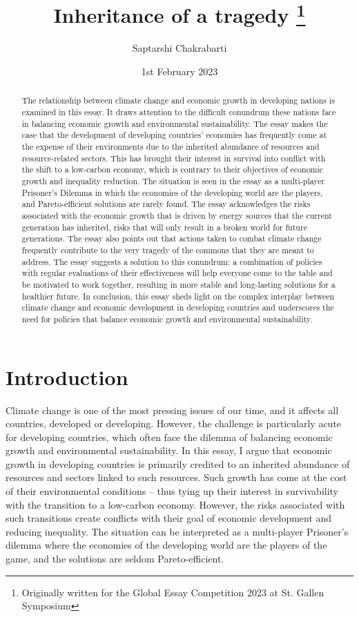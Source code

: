 \documentclass[11pt,a4paper]{article}
\title{Inheritance of a tragedy \footnote{Originally written for the Global Essay Competition 2023 at St. Gallen Symposium}}
\author{Saptarshi Chakrabarti}
\date{1st February 2023}
\begin{document}
\maketitle

\begin{abstract}
The relationship between climate change and economic growth in developing nations is examined in this essay. It draws attention to the difficult conundrum these nations face in balancing economic growth and environmental sustainability. The essay makes the case that the development of developing countries' economies has frequently come at the expense of their environments due to the inherited abundance of resources and resource-related sectors. This has brought their interest in survival into conflict with the shift to a low-carbon economy, which is contrary to their objectives of economic growth and inequality reduction. The situation is seen in the essay as a multi-player Prisoner's Dilemma in which the economies of the developing world are the players, and Pareto-efficient solutions are rarely found. The essay acknowledges the risks associated with the economic growth that is driven by energy sources that the current generation has inherited, risks that will only result in a broken world for future generations. The essay also points out that actions taken to combat climate change frequently contribute to the very tragedy of the commons that they are meant to address. The essay suggests a solution to this conundrum: a combination of policies with regular evaluations of their effectiveness will help everyone come to the table and be motivated to work together, resulting in more stable and long-lasting solutions for a healthier future. In conclusion, this essay sheds light on the complex interplay between climate change and economic development in developing countries and underscores the need for policies that balance economic growth and environmental sustainability.
\end{abstract}

\newpage
\section*{Introduction}
Climate change is one of the most pressing issues of our time, and it affects all countries, developed or developing. However, the challenge is particularly acute for developing countries, which often face the dilemma of balancing economic growth and environmental sustainability. In this essay, I argue that economic growth in developing countries is primarily credited to an inherited abundance of resources and sectors linked to such resources. Such growth has come at the cost of their environmental conditions – thus tying up their interest in survivability with the transition to a low-carbon economy. However, the risks associated with such transitions create conflicts with their goal of economic development and reducing inequality. The situation can be interpreted as a multi-player Prisoner's dilemma where the economies of the developing world are the players of the game, and the solutions are seldom Pareto-efficient. 
\end{document}
